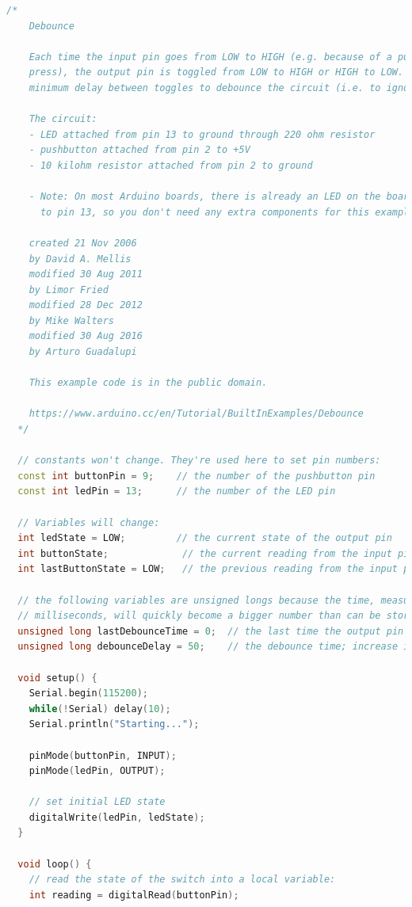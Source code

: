 \begin{lstlisting}[language=C++, caption={This is the Arduino example of software debouncing.},label={lst:debounce}]
	/*
	Debounce
  
	Each time the input pin goes from LOW to HIGH (e.g. because of a push-button
	press), the output pin is toggled from LOW to HIGH or HIGH to LOW. There's a
	minimum delay between toggles to debounce the circuit (i.e. to ignore noise).
  
	The circuit:
	- LED attached from pin 13 to ground through 220 ohm resistor
	- pushbutton attached from pin 2 to +5V
	- 10 kilohm resistor attached from pin 2 to ground
  
	- Note: On most Arduino boards, there is already an LED on the board connected
	  to pin 13, so you don't need any extra components for this example.
  
	created 21 Nov 2006
	by David A. Mellis
	modified 30 Aug 2011
	by Limor Fried
	modified 28 Dec 2012
	by Mike Walters
	modified 30 Aug 2016
	by Arturo Guadalupi
  
	This example code is in the public domain.
  
	https://www.arduino.cc/en/Tutorial/BuiltInExamples/Debounce
  */
  
  // constants won't change. They're used here to set pin numbers:
  const int buttonPin = 9;    // the number of the pushbutton pin
  const int ledPin = 13;      // the number of the LED pin
  
  // Variables will change:
  int ledState = LOW;         // the current state of the output pin
  int buttonState;             // the current reading from the input pin
  int lastButtonState = LOW;   // the previous reading from the input pin
  
  // the following variables are unsigned longs because the time, measured in
  // milliseconds, will quickly become a bigger number than can be stored in an int.
  unsigned long lastDebounceTime = 0;  // the last time the output pin was toggled
  unsigned long debounceDelay = 50;    // the debounce time; increase if the output flickers
  
  void setup() {
	Serial.begin(115200);
	while(!Serial) delay(10);
	Serial.println("Starting...");
	
	pinMode(buttonPin, INPUT);
	pinMode(ledPin, OUTPUT);
  
	// set initial LED state
	digitalWrite(ledPin, ledState);
  }
  
  void loop() {
	// read the state of the switch into a local variable:
	int reading = digitalRead(buttonPin);
  

\end{lstlisting}
